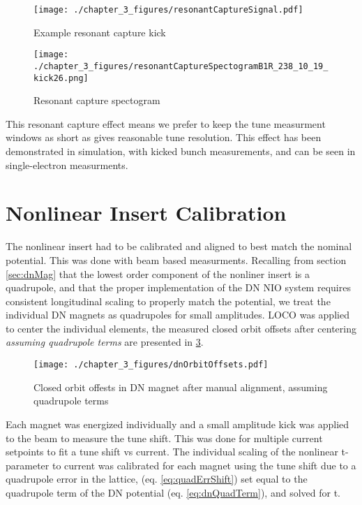 \begin{figure}
	\centering
	\texttt{[image: ./chapter\_3\_figures/resonantCaptureSignal.pdf]}
	\caption{Example resonant capture kick}
	\label{fig:resCapReal}
\end{figure}


\begin{figure}
	\centering
	\texttt{[image: ./chapter\_3\_figures/resonantCaptureSpectogramB1R\_238\_10\_19\_kick26.png]}
	\caption{Resonant capture spectogram}
	\label{fig:specResCap}
\end{figure}

This resonant capture effect means we prefer to keep the tune measurment windows as short as gives reasonable tune resolution. This effect has been demonstrated in simulation, with kicked bunch measurements, and can be seen in single-electron measurments.

\section{Nonlinear Insert Calibration} \label{sec:nioCal}
The nonlinear insert had to be calibrated and aligned to best match the nominal potential. This was done with beam based measurments. Recalling from section \ref{sec:dnMag} that the lowest order component of the nonliner insert is a quadrupole, and that the proper implementation of the DN NIO system requires consistent longitudinal scaling to properly match the potential, we treat the individual DN magnets as quadrupoles for small amplitudes. LOCO was applied to center the individual elements, the measured closed orbit offsets after centering \textit{assuming quadrupole terms} are presented in \ref{fig:dnOffset}. 

\begin{figure}
	\centering
	\texttt{[image: ./chapter\_3\_figures/dnOrbitOffsets.pdf]}
	\caption{Closed orbit offests in DN magnet after manual alignment, assuming quadrupole terms}
	\label{fig:dnOffset}
\end{figure}


Each magnet was energized individually and a small amplitude kick was applied to the beam to measure the tune shift. This was done for multiple current setpoints to fit a tune shift vs current.
The individual scaling of the nonlinear t-parameter to current was calibrated for each magnet using the tune shift due to a quadrupole error in the lattice, (eq. \ref{eq:quadErrShift}) set equal to the quadrupole term of the DN potential (eq. \ref{eq:dnQuadTerm}), and solved for t.

